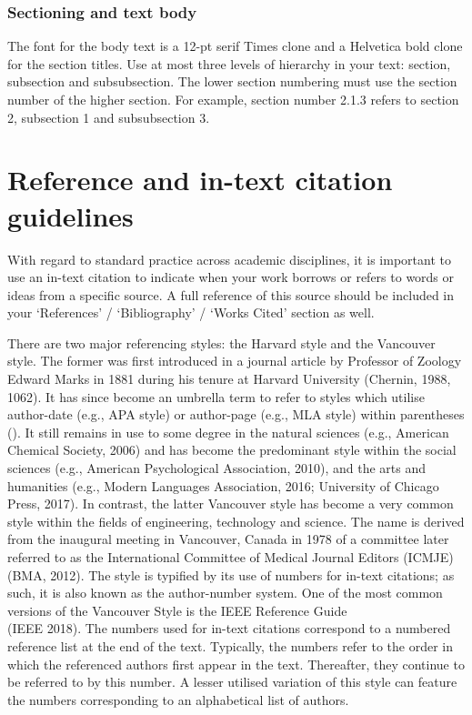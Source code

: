\documentclass[english, 12pt, a4paper, elec, utf8, a-2b, online]{aaltothesis}
\begin{document}
\subsubsection*{Sectioning and text body}

The font for the body text is a 12-pt serif Times clone and a Helvetica bold 
clone for the section titles. Use at most three levels of hierarchy in your 
text: section, subsection and subsubsection. The lower section numbering must 
use the section number of the higher section. For example, section number 2.1.3 
refers to section 2, subsection 1 and subsubsection 3.

\clearpage
\section{Reference and in-text citation guidelines}
\label{app:reference}

With regard to standard practice across academic disciplines, it is important to
use an in-text citation to indicate when your work borrows or refers to words or
ideas from a specific source. A full reference of this source should be included
in your ‘References’ / ‘Bibliography’ / ‘Works Cited’ section as well.

There are two major referencing styles: the Harvard style and the Vancouver 
style. The former was first introduced in a journal article by Professor of 
Zoology Edward Marks in 1881 during his tenure at Harvard University (Chernin, 
1988, 1062). It has since become an umbrella term to refer to styles which 
utilise author-date (e.g., APA style) or author-page (e.g., MLA style) within 
parentheses (). It still remains in use to some degree in the natural sciences 
(e.g., American Chemical Society, 2006) and has become the predominant style 
within the social sciences (e.g., American Psychological Association, 2010), and
the arts and humanities (e.g., Modern Languages Association, 2016; University of
Chicago Press, 2017). In contrast, the latter Vancouver style has become a very 
common style within the fields of engineering, technology and science. The name 
is derived from the inaugural meeting in Vancouver, Canada in 1978 of a 
committee later referred to as the International Committee of Medical Journal 
Editors (ICMJE) (BMA, 2012). The style is typified by its use of numbers for 
in-text citations; as such, it is also known as the author-number system. One of
the most common versions of the Vancouver Style is the IEEE Reference Guide \\
(IEEE 2018). The numbers used for in-text citations correspond to a numbered 
reference list at the end of the text. Typically, the numbers refer to the order
in which the referenced authors first appear in the text. Thereafter, they 
continue to be referred to by this number. A lesser utilised variation of this 
style can feature the numbers corresponding to an alphabetical list of authors.
\end{document}
